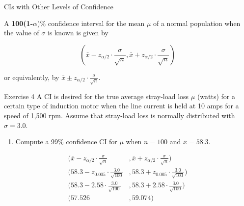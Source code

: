 \documentclass[
  ignorenonframetext,
]{beamer}
\providecommand{\tightlist}{%
  \setlength{\itemsep}{0pt}\setlength{\parskip}{0pt}}\usepackage{longtable,booktabs,array}
\begin{document}
\begin{frame}{CIs with Other Levels of Confidence}
\protect\hypertarget{cis-with-other-levels-of-confidence}{}
\begin{tcolorbox}[enhanced jigsaw, titlerule=0mm, colbacktitle=quarto-callout-important-color!10!white, opacityback=0, bottomrule=.15mm, colback=white, colframe=quarto-callout-important-color-frame, arc=.35mm, title=\textcolor{quarto-callout-important-color}{\faExclamation}\hspace{0.5em}{Definition}, toprule=.15mm, breakable, coltitle=black, leftrule=.75mm, bottomtitle=1mm, left=2mm, rightrule=.15mm, toptitle=1mm, opacitybacktitle=0.6]

A \textbf{100(1-}\(\alpha\))\% confidence interval for the mean \(\mu\)
of a normal population when the value of \(\sigma\) is known is given by

\[
\left(\bar{x} - z_{\alpha/2}\cdot\frac{\sigma}{\sqrt{n}}, \bar{x} + z_{\alpha/2}\cdot\frac{\sigma}{\sqrt{n}}\right)
\]

or equivalently, by
\(\bar{x} \pm z_{\alpha/2}\cdot\frac{\sigma}{\sqrt{n}}\).

\end{tcolorbox}
\end{frame}

\begin{frame}{Exercise 4}
\protect\hypertarget{exercise-4-2}{}
A CI is desired for the true average stray-load loss \(\mu\) (watts) for
a certain type of induction motor when the line current is held at 10
amps for a speed of 1,500 rpm. Assume that stray-load loss is normally
distributed with \(\sigma = 3.0\).

\begin{enumerate}[<+->]
[a.]
\setcounter{enumi}{2}
\tightlist
\item
  Compute a 99\% confidence CI for \(\mu\) when \(n=100\) and
  \(\bar{x} = 58.3\).
\end{enumerate}

\[ 
\begin{aligned}
(\bar{x} - z_{\alpha/2} \cdot \frac{\sigma}{\sqrt{n}} &, \bar{x} + z_{\alpha/2} \cdot \frac{\sigma}{\sqrt{n}}) \\
(58.3 - z_{0.005} \cdot \frac{3.0}{\sqrt{100}} &, 58.3 + z_{0.005} \cdot \frac{3.0}{\sqrt{100}})  \\
(58.3 - 2.58 \cdot \frac{3.0}{\sqrt{100}} &, 58.3 + 2.58 \cdot \frac{3.0}{\sqrt{100}} ) \\
(57.526 &, 59.074) \\
\end{aligned}
\]
\end{frame}
\end{document}
